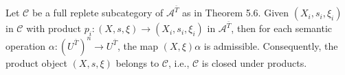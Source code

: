 Let $\mathcal{C}$ be a full replete subcategory of $\mathcal{A}^{\bar{T}}$ as in Theorem 5.6. Given $(X_i, s_i, \xi_i)$ in $\mathcal{C}$ with product $p_i: (X, s, \xi) \longrightarrow (X_i, s_i, \xi_i)$ in $\mathcal{A}^{\bar{T}}$, then for each semantic operation $\alpha: (U^{\bar{T}})^n \longrightarrow U^{\bar{T}}$, the map $(X, \xi)\alpha$ is admissible. Consequently, the product object $(X, s, \xi)$ belongs to $\mathcal{C}$, i.e., $\mathcal{C}$ is closed under products.
